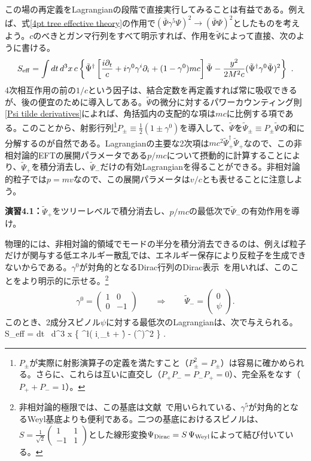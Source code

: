 この場の再定義をLagrangianの段階で直接実行してみることは有益である。例えば、式\eqref{4pt tree effective theory}の作用で$(\bar  \Psi \gamma^5 \Psi)^2 \to (\bar  \Psi  \Psi)^2$としたものを考えよう。$c$のべきとガンマ行列をすべて明示すれば、作用を$\tilde \Psi$によって直接、次のように書ける。
%
\begin{align} \label{4pt tree effective action with c}
	S_{\rm eff} = \int dt \, d^3 x \, c \left\{ \tilde \Psi^\dag \left[ \frac{ i \partial_t}{c}  +  i \gamma^0 \gamma^i \partial_i +  (1 - \gamma^0) m c  \right] \tilde \Psi - \frac{y^2}{2 M^2c} (\tilde \Psi^\dag \gamma^0 \tilde \Psi )^2\right\} \ .
\end{align}
%
4次相互作用の前の$1/c$という因子は、結合定数を再定義すれば常に吸収できるが、後の便宜のために導入してある。$\tilde \Psi$の微分に対するパワーカウンティング則\eqref{Psi tilde derivatives}によれば、角括弧内の支配的な項は$m c$に比例する項である。このことから、射影行列\footnote{$P_\pm$が実際に射影演算子の定義を満たすこと（$P_\pm^2 = P_\pm$）は容易に確かめられる。さらに、これらは互いに直交し（$P_+ P_- = P_- P_+ = 0$）、完全系をなす（$P_+ + P_- = 1$）。}$P_\pm \equiv \tfrac{1}{2} (1 \pm \gamma^0)$を導入して、$\tilde \Psi$を$\tilde \Psi_\pm \equiv P_\pm \tilde \Psi$の和に分解するのが自然である。Lagrangianの主要な2次項は$mc^2  \tilde \Psi_+^\dag \tilde \Psi_+$なので、この非相対論的EFTの展開パラメータである$p/mc$について摂動的に計算することにより、$\tilde \Psi_+$を積分消去し、$\tilde \Psi_-$だけの有効Lagrangianを得ることができる。非相対論的粒子では$p = m v$なので、この展開パラメータは$v /c$とも表せることに注意しよう。
%
\begin{eBox}
%
{\bf 演習4.1：}$\tilde \Psi_+$をツリーレベルで積分消去し、$p/mc$の最低次で$\tilde \Psi_-$の有効作用を導け。
%
\end{eBox}

物理的には、非相対論的領域でモードの半分を積分消去できるのは、例えば粒子だけが関与する低エネルギー散乱では、エネルギー保存により反粒子を生成できないからである。$\gamma^0$が対角的となるDirac行列のDirac表示~\cite{Zee:2003mt}を用いれば、このことをより明示的に示せる。\footnote{非相対論的極限では、この基底は文献~\cite{Srednicki:2007ab}で用いられている、$\gamma^5$が対角的となるWeyl基底よりも便利である。二つの基底におけるスピノルは、$S = \frac{1}{\sqrt{2}} \left( \begin{smallmatrix} 1 & 1 \\ -1 & 1 \end{smallmatrix} \right)$とした線形変換$\Psi_{\rm Dirac} = S \, \Psi_{\rm Weyl}$によって結び付いている。}
%
\begin{align} \label{2-spinor def}
	\gamma^0 = \begin{pmatrix}
		1 &  0 \\ 0 & -1 
	\end{pmatrix} \qquad \Longrightarrow \qquad \tilde \Psi_- = \begin{pmatrix}
		0 \\ \psi 
	\end{pmatrix} .
\end{align}
% 
このとき、2成分スピノル$\psi$に対する最低次のLagrangianは、次で与えられる。
%
\be \label{S psi}
S_{\rm eff} = \int dt \, d^3 x \left\{ \psi^\dag \l( i \d_t  +  \r) \psi  -  (\psi^\dag \psi )^2 \right\} . 
\ee
%

